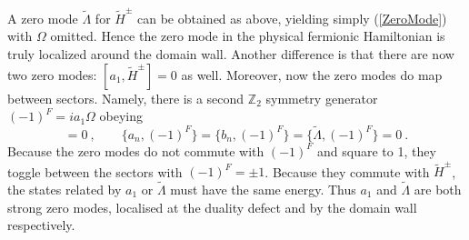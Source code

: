 \documentclass[11pt]{article}
\newcommand{\comment}[1]{{}}
\numberwithin{equation}{section}		%
\begin{document}
\comment{The subspace spanned by $\ket{\tilde{E}^\pm,f}$ and $a_1\ket{\tilde{E}^\pm,f} $ can equivalently be spanned by the states $e^{-i \pi s a_1/4} \ket{\tilde{E}^\pm,+}$ for $s = \pm1$. With the feature that,
\Omega e^{-i \pi s a_1/4} \ket{\tilde{E}^\pm,+} = s e^{-i \pi s a_1/4} \ket{\tilde{E}^\pm,+}.
\end{align}
and similarly with $e^{-i \pi s a_1/4} \ket{\tilde{E}^-,+}$. 
So that the eigenvectors of 
\begin{align}
H^{d\pm} = \tilde{H}^+ P_\pm + \tilde{H}^- P_\mp
\end{align}
are given by  $e^{\mp i \pi a_1/4} \ket{\tilde{E}^+,+}$ and $e^{\pm i \pi a_1/4} \ket{\tilde{E}^-,+}$. Hence given the eigenvectors of the mixed sector Hamiltonian, one can find the eigenvectors of the duality twisted Hamiltonian. 
}

A zero mode  $\widetilde{\Lambda}$ for $\tilde{H}^{\pm}$ can be obtained as above, yielding simply (\ref{ZeroMode}) with $\Omega$ omitted. 
Hence the zero mode in the physical fermionic Hamiltonian is truly localized around the domain wall. Another difference is that there are now two zero modes: $[a_1,\tilde{H}^{\pm} ]=0$ as well. Moreover, now the zero modes do map between sectors.
Namely, there is a second ${\mathbb Z}_2$ symmetry generator  $(-1)^F = i a_1 \Omega$ obeying
\begin{equation}
[(-1)^F, \tilde{H}^{\pm} ]=0\ ,\qquad \{a_n,(-1)^F\}=\{b_n,(-1)^F\}=\{\widetilde{\Lambda},(-1)^F\}=0\ .
\end{equation}
Because the zero modes do not commute with $(-1)^F$ and square to 1, they toggle between the sectors with $(-1)^F=\pm 1$. Because they commute with $\tilde{H}^{\pm}$, the states related by $a_1$ or $\widetilde{\Lambda}$ must have the same energy. Thus $a_1$ and $\widetilde{\Lambda}$ are both strong zero modes, localised at the duality defect and by the domain wall respectively.

\end{document}
